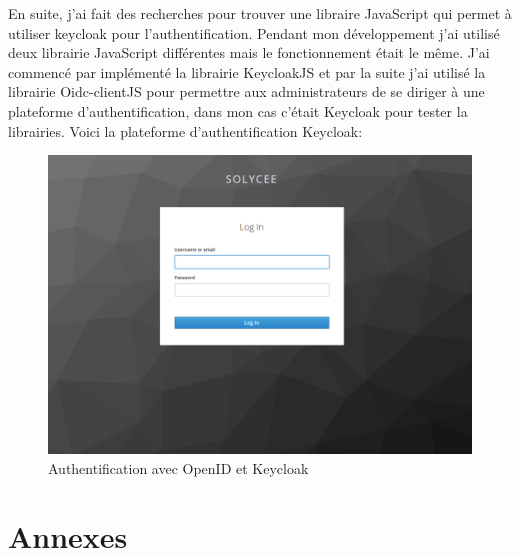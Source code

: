 \documentclass[12pt]{article}
\begin{document}
En suite, j'ai fait des recherches pour trouver une libraire JavaScript qui permet à utiliser keycloak pour l'authentification. Pendant mon développement j'ai utilisé deux librairie JavaScript différentes mais le fonctionnement était le même. J'ai commencé par implémenté la librairie KeycloakJS et par la suite j'ai utilisé la librairie Oidc-clientJS pour permettre aux administrateurs de se diriger à une plateforme d'authentification, dans mon cas c'était Keycloak pour tester la librairies. Voici la plateforme d'authentification Keycloak: 
 \begin{figure}[H]
	\centering
 		\includegraphics[width=1\textwidth]{diagrammes/authentification_keycloak.png} 
  		\caption{Authentification avec OpenID et Keycloak }
	\end{figure}

\newpage
\section{Annexes}
\end{document}
